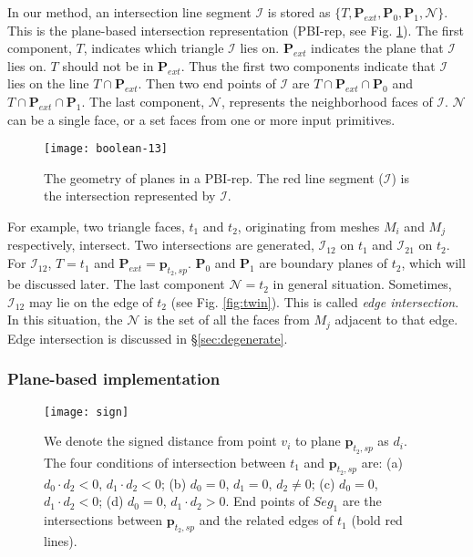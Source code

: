 In our method, an intersection line segment  $\bm{\mathcal{I}}$ is stored as $\{T, \bm{P}_{ext}, \bm{P}_0, \bm{P}_1, \mathcal{N}\}$. This is the plane-based intersection representation (PBI-rep,  see Fig. \ref{fig:pbi}). The first component, $T$, indicates which triangle $\bm{\mathcal{I}}$ lies on.
$\bm{P}_{ext}$ indicates the plane that $\bm{\mathcal{I}}$ lies on. $T$ should not be in $\bm{P}_{ext}$. Thus the first two components indicate that  $\bm{\mathcal{I}}$ lies on the line $T \cap \bm{P}_{ext}$.
Then two end points of $\bm{\mathcal{I}}$ are $T \cap \bm{P}_{ext}\cap\bm{P}_0$ and $T \cap \bm{P}_{ext}\cap\bm{P}_1$.
The last component, $\mathcal{N}$, represents the neighborhood faces of $\bm{\mathcal{I}}$. $\mathcal{N}$ can be a single face, or a set faces from one or more input primitives.

\begin{figure}[t]
\centering
\texttt{[image: boolean-13]}
\caption{The geometry of planes in a PBI-rep. The red line segment ($\bm{\mathcal{I}}$) is the intersection represented by $\bm{\mathcal{I}}$.}
\label{fig:pbi}
\end{figure}

For example, two triangle faces, $t_1$ and $t_2$, originating from meshes $M_i$ and $M_j$ respectively, intersect. Two intersections are generated, ${\bm{\mathcal{I}}}_{12}$ on $t_1$ and ${\bm{\mathcal{I}}}_{21}$ on $t_2$.
For ${\bm{\mathcal{I}}}_{12}$, $T = t_1$ and $\bm{P}_{ext}=\bm{p}_{t_2, sp}$. $\bm{P}_0$ and $\bm{P}_1$ are boundary planes of $t_2$, which will be discussed later.
The last component $\mathcal{N}=t_2$ in general situation. Sometimes, ${\bm{\mathcal{I}}}_{12}$ may lie on the edge of $t_2$ (see Fig. \ref{fig:twin}). This is called \emph{edge intersection}. In this situation, the $\mathcal{N}$ is the set of all the faces from $M_j$ adjacent to that edge. Edge intersection is discussed in \S\ref{sec:degenerate}.


\subsubsection{Plane-based implementation}

\label{sec:embed}
\begin{figure}[t]
\centering
\texttt{[image: sign]}
\caption{We denote the signed distance from point $v_i$ to plane $\bm{p}_{t_2, sp}$ as $d_i$. The four conditions of intersection between $t_1$ and $\bm{p}_{t_2, sp}$ are:
(a) $d_0\cdot d_2<0$, $d_1\cdot d_2<0$;
(b) $d_0=0$, $d_1=0$, $d_2\neq 0$;
(c) $d_0=0$, $d_1\cdot d_2<0$;
(d) $d_0=0$, $d_1\cdot d_2>0$. End points of $Seg_1$ are the intersections between $\bm{p}_{t_2, sp}$ and the related edges of $t_1$ (bold red lines).}
\label{fig:isect}
\end{figure}

